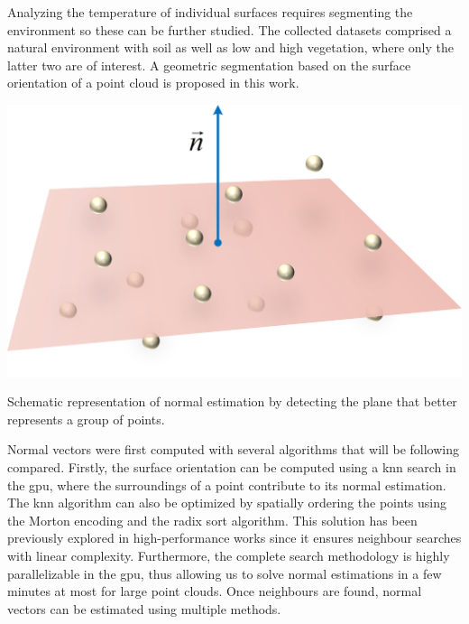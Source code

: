 Analyzing the temperature of individual surfaces requires segmenting the environment so these can be further studied. The collected datasets comprised a natural environment with soil as well as low and high vegetation, where only the latter two are of interest. A geometric segmentation based on the surface orientation of a point cloud is proposed in this work.

\begin{marginfigure}[1cm]
	\includegraphics{figs/thermal_projection/plane_fitting.png}
	\caption{Schematic representation of normal estimation by detecting the plane that better represents a group of points.}
	\label{fig:plane_fitting}
\end{marginfigure}
Normal vectors were first computed with several algorithms that will be following compared. Firstly, the surface orientation can be computed using a \acrshort{knn} search in the \acrshort{gpu}, where the surroundings of a point contribute to its normal estimation. The \acrshort{knn} algorithm can also be optimized by spatially ordering the points using the Morton encoding and the radix sort algorithm. This solution has been previously explored in high-performance works \cite{jakob_optimizing_2021} since it ensures neighbour searches with linear complexity. Furthermore, the complete search methodology is highly parallelizable in the \acrshort{gpu}, thus allowing us to solve normal estimations in a few minutes at most for large point clouds. Once neighbours are found, normal vectors can be estimated using multiple methods.

